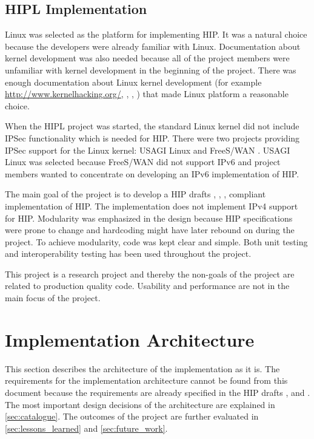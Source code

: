 \subsection{HIPL Implementation}

Linux was selected as the platform for implementing HIP. It was a
natural choice because the developers were already familiar with
Linux. Documentation about kernel development was also needed because
all of the project members were unfamiliar with kernel development in
the beginning of the project. There was enough documentation about
Linux kernel development (for example
\url{http://www.kernelhacking.org/}, \cite{kernelarch},
\cite{kernellinks}, \cite{kmodguide}) that made Linux platform a
reasonable choice.

When the HIPL project was started, the standard Linux kernel did not
include IPSec functionality which is needed for HIP. There were two
projects providing IPSec support for the Linux kernel: USAGI Linux
\cite{usagi} and FreeS/WAN \cite{freeswan}. USAGI Linux was selected
because FreeS/WAN did not support IPv6 and project members wanted to
concentrate on developing an IPv6 implementation of HIP.

The main goal of the project is to develop a HIP drafts \cite{hip},
\cite{hiparch}, \cite{hipimpl}, \cite{hip-mm} compliant implementation
of HIP. The implementation does not implement IPv4 support for
HIP. Modularity was emphasized in the design because HIP
specifications were prone to change and hardcoding might have later
rebound on during the project. To achieve modularity, code was kept
clear and simple. Both unit testing and interoperability testing has
been used throughout the project.

This project is a research project and thereby the non-goals of the
project are related to production quality code. Usability and
performance are not in the main focus of the project.

\section{Implementation Architecture}
\label{sec:implementation_architecture}

This section describes the architecture of the implementation as it
is. The requirements for the implementation architecture cannot be
found from this document because the requirements are already
specified in the HIP drafts \cite{hiparch}, \cite{hip} and
\cite{hip-mm}. The most important design decisions of the architecture
are explained in \autoref{sec:catalogue}. The outcomes of the project
are further evaluated in \autoref{sec:lessons_learned} and
\autoref{sec:future_work}.


